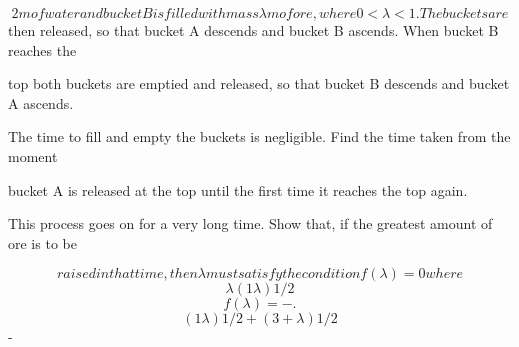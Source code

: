 \documentclass[12pt]{article}
\begin{document}
\begin{flushleft}
\[2m of water and bucket B is filled with mass λm of ore, where 0 < λ < 1. The buckets are\]
then released, so that bucket A descends and bucket B ascends. When bucket B reaches the\par
top both buckets are emptied and released, so that bucket B descends and bucket A ascends.\par
The time to fill and empty the buckets is negligible. Find the time taken from the moment\par
bucket A is released at the top until the first time it reaches the top again.\par
This process goes on for a very long time. Show that, if the greatest amount of ore is to be\par
\[raised in that time, then λ must satisfy the condition f (λ) = 0 where\]
\[λ(1 λ)1/2\]
\[f(λ) = - .\]
\[(1 λ)1/2 + (3 + λ)1/2\]
-\par
\end{flushleft}
\end{document}
